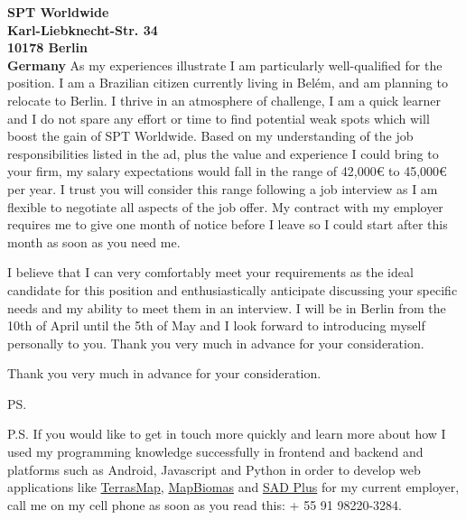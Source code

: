 \documentclass[a4paper]{joaosoares-letter}
\begin{document}
\begin{letter}{\bfseries SPT Worldwide\\Karl-Liebknecht-Str. 34\\10178 Berlin\\Germany}
As my experiences illustrate I am particularly well-qualified for the position. I am a Brazilian citizen currently living in Belém, and am planning to relocate to Berlin. I thrive in an atmosphere of challenge, I am a quick learner and I do not spare any effort or time to find potential weak spots which will boost the gain of SPT Worldwide. Based on my understanding of the job responsibilities listed in the ad, plus the value and experience I could bring to your firm, my salary expectations would fall in the range of 42,000€ to 45,000€ per year. I trust you will consider this range following a job interview as I am flexible to negotiate all aspects of the job offer. My contract with my employer requires me to give one month of notice before I leave so I could start after this month as soon as you need me.

I believe that I can very comfortably meet your requirements as the ideal candidate for this position and enthusiastically anticipate discussing your specific needs and my ability to meet them in an interview. I will be in Berlin from the 10th of April until the 5th of May and I look forward to introducing myself personally to you. Thank you very much in advance for your consideration. 

\closing{Thank you very much in advance for your consideration.}
\vspace{10pt}
\ps

P.S. If you would like to get in touch more quickly and learn more about how I used my programming knowledge successfully in frontend and backend and platforms such as Android, Javascript and Python in order to develop web applications like \href{https://goo.gl/6gUzPA}{TerrasMap}, \href{https://goo.gl/eYX5SW}{MapBiomas} and \href{https://goo.gl/2J41hR}{SAD Plus} for my current employer, call me on my cell phone as soon as you read this: + 55 91 98220-3284.
\vspace{\fill}

\end{letter}
\end{document}

